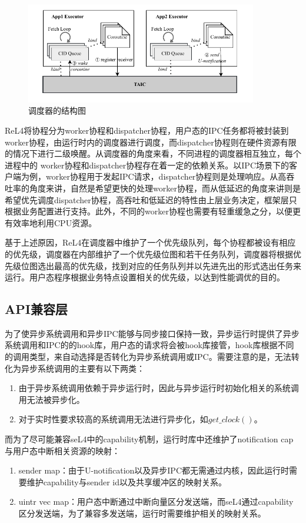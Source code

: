 \begin{figure}[htbp]
  \centering
  \includegraphics[width=0.9\textwidth]{figures/TAIC.drawio.pdf}
  \caption{调度器的结构图}\label{fig:executor}
\end{figure}

ReL4将协程分为worker协程和dispatcher协程，用户态的IPC任务都将被封装到worker协程，由运行时内的调度器进行调度，而dispatcher协程则在硬件资源有限的情况下进行二级唤醒。从调度器的角度来看，不同进程的调度器相互独立，每个进程中的 worker协程和dispatcher协程存在着一定的依赖关系。以IPC场景下的客户端为例，worker协程用于发起IPC请求，dispatcher协程则是处理响应。从高吞吐率的角度来讲，自然是希望更快的处理worker协程，而从低延迟的角度来讲则是希望优先调度dispatcher协程，高吞吐和低延迟的特性由上层业务决定，框架层只根据业务配置进行支持。此外，不同的worker协程也需要有轻重缓急之分，以便更有效率地利用CPU资源。

基于上述原因，ReL4在调度器中维护了一个优先级队列，每个协程都被设有相应的优先级，调度器在内部维护了一个优先级位图和若干任务队列，调度器将根据优先级位图选出最高的优先级，找到对应的任务队列并以先进先出的形式选出任务来运行。用户态程序根据业务特点设置相关的优先级，以达到性能调优的目的。

\subsection{API兼容层}

为了使异步系统调用和异步IPC能够与同步接口保持一致，异步运行时提供了异步系统调用和IPC的的hook库，用户态的请求将会被hook库接管，hook库根据不同的调用类型，来自动选择是否转化为异步系统调用或IPC。需要注意的是，无法转化为异步系统调用的主要有以下两类：
\begin{enumerate}
  \item 由于异步系统调用依赖于异步运行时，因此与异步运行时初始化相关的系统调用无法被异步化。
  \item 对于实时性要求较高的系统调用无法进行异步化，如$get\_clock()$。
\end{enumerate}
  
而为了尽可能兼容seL4中的capability机制，运行时库中还维护了notification cap与用户态中断相关资源的映射：
\begin{enumerate}
  \item sender map：由于U-notification以及异步IPC都无需通过内核，因此运行时需要维护capability与sender id以及共享缓冲区的映射关系。
  \item uintr vec map：用户态中断通过中断向量区分发送端，而seL4通过capability区分发送端，为了兼容多发送端，运行时需要维护相关的映射关系。
\end{enumerate}

